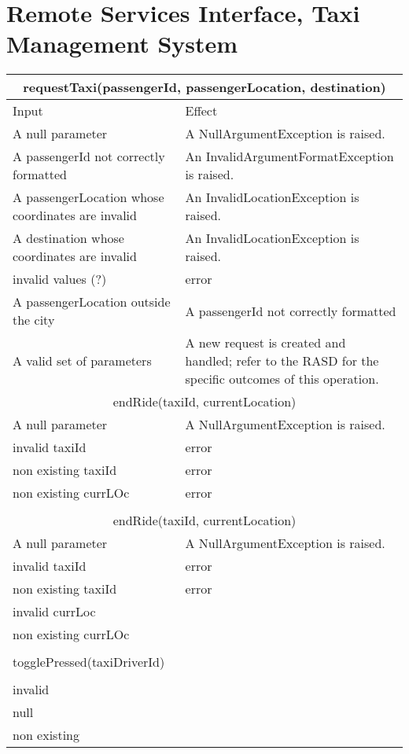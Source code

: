 \documentclass[11pt,oneside,a4paper]{report}
\begin{document}
\section{Remote Services Interface, Taxi Management System}
\begin{tabular}{p{5cm}|p{6cm}}
	\hline
	\multicolumn{2}{c}{requestTaxi(passengerId, passengerLocation, destination)}\\\hline
	Input & Effect \\\hline
	A null parameter &
	A NullArgumentException is raised.\\\hline
	A passengerId not correctly formatted &
	An InvalidArgumentFormatException is raised. \\\hline
	A passengerLocation whose coordinates are invalid &
	An InvalidLocationException is raised. \\\hline
	A destination whose coordinates are invalid &
	An InvalidLocationException is raised. \\\hline
	invalid values (?) &
	error \\\hline
	A passengerLocation outside the city &
	A passengerId not correctly formatted \\\hline
	A valid set of parameters &
	A new request is created and handled; refer to the RASD for the specific outcomes of this operation. \\\hline\hline
	
	\multicolumn{2}{c}{endRide(taxiId, currentLocation)}\\\hline
	A null parameter &
	A NullArgumentException is raised. \\\hline
		invalid taxiId &
	error \\\hline
	
		non existing taxiId &
	error \\\hline

				non existing currLOc &
	error \\\hline\\\hline

\multicolumn{2}{c}{endRide(taxiId, currentLocation)}\\\hline
	A null parameter &
	A NullArgumentException is raised. \\\hline
	
				invalid taxiId &
		error \\\hline
		
						non existing taxiId &
			error \\\hline

	invalid currLoc\\\hline
	non existing currLOc\\\hline\\\hline
	 togglePressed(taxiDriverId)\\\hline\\
	invalid\\\hline
	null\\\hline
	non existing\\\hline
	
\end{tabular}
\end{document}
